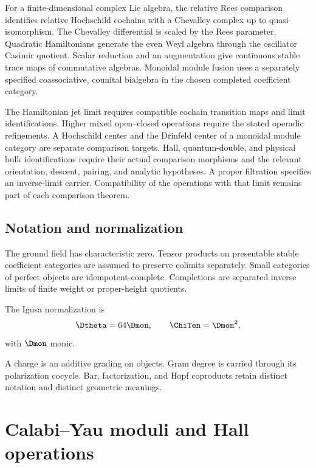 \documentclass[11pt,twoside,openright]{memoir}
\begin{document}
For a finite-dimensional complex Lie algebra, the relative Rees comparison identifies relative Hochschild cochains with a Chevalley complex up to quasi-isomorphism. The Chevalley differential is scaled by the Rees parameter. Quadratic Hamiltonians generate the even Weyl algebra through the oscillator Casimir quotient. Scalar reduction and an augmentation give continuous stable trace maps of commutative algebras. Monoidal module fusion uses a separately specified coassociative, counital bialgebra in the chosen completed coefficient category.

The Hamiltonian jet limit requires compatible cochain transition maps and limit identifications. Higher mixed open--closed operations require the stated operadic refinements. A Hochschild center and the Drinfeld center of a monoidal module category are separate comparison targets. Hall, quantum-double, and physical bulk identifications require their actual comparison morphisms and the relevant orientation, descent, pairing, and analytic hypotheses. A proper filtration specifies an inverse-limit carrier. Compatibility of the operations with that limit remains part of each comparison theorem.

\chapter*{Notation and normalization}
The ground field has characteristic zero.  Tensor products on presentable stable coefficient categories are assumed to preserve colimits separately. Small categories of perfect objects are idempotent-complete.  Completions are separated inverse limits of finite weight or proper-height quotients.

The Igusa normalization is
\[
 \Dtheta=64\Dmon,\qquad \ChiTen=\Dmon^2,
\]
with $\Dmon$ monic.

A charge is an additive grading on objects. Gram degree is carried through its polarization cocycle. Bar, factorization, and Hopf coproducts retain distinct notation and distinct geometric meanings.

\cleardoublepage
\tableofcontents
\mainmatter
\part{Calabi--Yau moduli and Hall operations}







\end{document}
